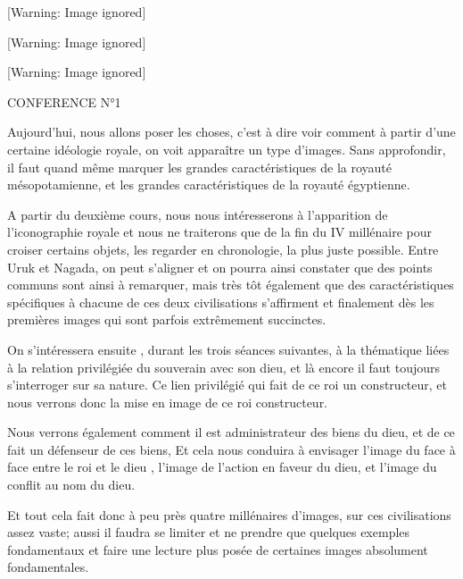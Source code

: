 \documentclass[a4paper,10pt]{article}
\begin{document}
\begin{center}
 [Warning: Image ignored] %

\end{center}
\begin{center}
 [Warning: Image ignored] %

\end{center}
\begin{center}
 [Warning: Image ignored] %

\end{center}
CONFERENCE N°1  


Aujourd'hui, nous allons poser les choses, c'est à dire voir comment 
à partir d'une certaine idéologie royale, on voit apparaître un type 
d'images. Sans approfondir,  il faut quand même marquer les grandes 
caractéristiques de la royauté mésopotamienne, et les grandes 
caractéristiques de la royauté égyptienne.

A partir du deuxième cours, nous nous intéresserons à
l'apparition de l'iconographie royale
et nous ne traiterons que de la fin du IV millénaire pour croiser
certains objets, les regarder en chronologie, la plus juste possible.
Entre Uruk et Nagada, on peut s'aligner et on pourra
ainsi constater que des points communs sont ainsi à remarquer, mais
très tôt également que des caractéristiques spécifiques à chacune de
ces deux civilisations s'affirment et finalement dès
les premières images qui sont parfois extrêmement succinctes.

On s'intéressera ensuite , durant les trois séances
suivantes,  à la thématique liées à la relation privilégiée du
souverain avec son dieu, et là encore il faut toujours
s'interroger sur sa nature. Ce lien privilégié qui
fait de ce roi un constructeur, et nous verrons donc la mise en image
de ce roi constructeur.

Nous verrons également comment il est administrateur des biens du dieu,
et de ce fait un défenseur de ces biens,  Et cela nous conduira  à
envisager l'image du face à face entre le roi et le
dieu , l'image de l'action en faveur
du dieu, et l'image du conflit au nom du dieu.

Et tout cela fait donc à peu près quatre millénaires
d'images, sur ces civilisations assez vaste; aussi il
faudra se limiter et ne prendre que quelques exemples fondamentaux et
faire une lecture plus posée de certaines images absolument
fondamentales. 
\end{document}
